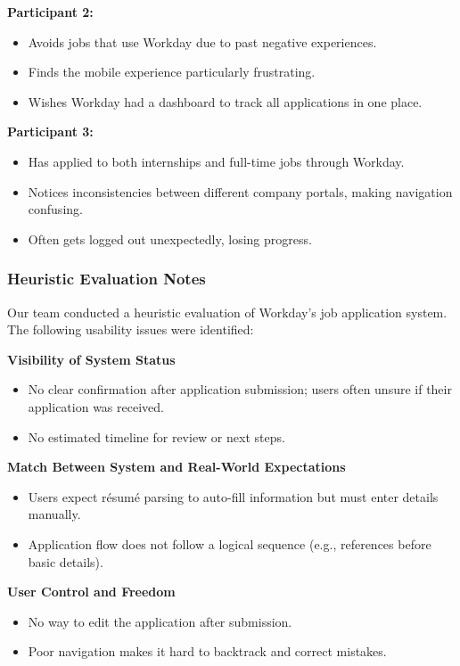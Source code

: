 \documentclass[
	letterpaper, %
]{jdf}
\begin{document}
\begin{sloppypar}
\textbf{Participant 2:}  
\begin{itemize}  
    \item Avoids jobs that use Workday due to past negative experiences.  
    \item Finds the mobile experience particularly frustrating.  
    \item Wishes Workday had a dashboard to track all applications in one place.  
\end{itemize}  

\textbf{Participant 3:}  
\begin{itemize}  
    \item Has applied to both internships and full-time jobs through Workday.  
    \item Notices inconsistencies between different company portals, making navigation confusing.  
    \item Often gets logged out unexpectedly, losing progress.  
\end{itemize}  
\hfill \break  

\subsubsection*{Heuristic Evaluation Notes}  

Our team conducted a heuristic evaluation of Workday’s job application system. The following usability issues were identified:   

\textbf{Visibility of System Status}  
\begin{itemize}  
    \item No clear confirmation after application submission; users often unsure if their application was received.  
    \item No estimated timeline for review or next steps.  
\end{itemize}   

\textbf{Match Between System and Real-World Expectations}  
\begin{itemize}  
    \item Users expect résumé parsing to auto-fill information but must enter details manually.  
    \item Application flow does not follow a logical sequence (e.g., references before basic details).  
\end{itemize}  


\textbf{User Control and Freedom}  
\begin{itemize}  
    \item No way to edit the application after submission.  
    \item Poor navigation makes it hard to backtrack and correct mistakes.  
\end{itemize}   


\end{sloppypar}
\end{document}
